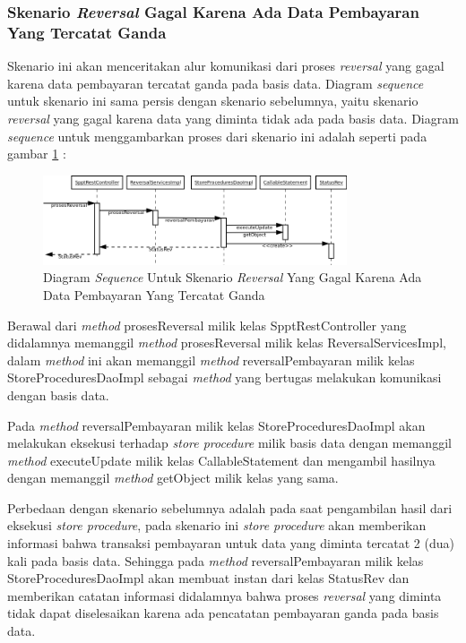 \documentclass[pdftex,12pt, oneside]{article}
\begin{document}
\subsubsection{Skenario \textit{Reversal} Gagal Karena Ada Data Pembayaran Yang Tercatat Ganda}

Skenario ini akan menceritakan alur komunikasi dari proses \textit{reversal} yang gagal karena data pembayaran tercatat ganda pada basis data. Diagram \textit{sequence} untuk skenario ini sama persis dengan skenario sebelumnya, yaitu skenario \textit{reversal} yang gagal karena data yang diminta tidak ada pada basis data. Diagram \textit{sequence} untuk menggambarkan proses dari skenario ini adalah seperti pada gambar \ref{fig:uml-seq-rev-double} :

\begin{figure}[H]
  \centering
  \includegraphics[width=0.8\textwidth]{./resources/diagram/uml-seq-rev-null}
  \caption{Diagram \textit{Sequence} Untuk Skenario \textit{Reversal} Yang Gagal Karena Ada Data Pembayaran Yang Tercatat Ganda}
  \label{fig:uml-seq-rev-double}
\end{figure}

Berawal dari \textit{method} prosesReversal milik kelas SpptRestController yang didalamnya memanggil \textit{method} prosesReversal milik kelas ReversalServicesImpl, dalam \textit{method} ini akan memanggil \textit{method} reversalPembayaran milik kelas StoreProceduresDaoImpl sebagai \textit{method} yang bertugas melakukan komunikasi dengan basis data.

Pada \textit{method} reversalPembayaran milik kelas StoreProceduresDaoImpl akan melakukan eksekusi terhadap \textit{store procedure} milik basis data dengan memanggil \textit{method} executeUpdate milik kelas CallableStatement dan mengambil hasilnya dengan memanggil \textit{method} getObject milik kelas yang sama.

Perbedaan dengan skenario sebelumnya adalah pada saat pengambilan hasil dari eksekusi \textit{store procedure}, pada skenario ini \textit{store procedure} akan memberikan informasi bahwa transaksi pembayaran untuk data yang diminta tercatat 2 (dua) kali pada basis data. Sehingga pada \textit{method} reversalPembayaran milik kelas StoreProceduresDaoImpl akan membuat instan dari kelas StatusRev dan memberikan catatan informasi didalamnya bahwa proses \textit{reversal} yang diminta tidak dapat diselesaikan karena ada pencatatan pembayaran ganda pada basis data.
\end{document}
